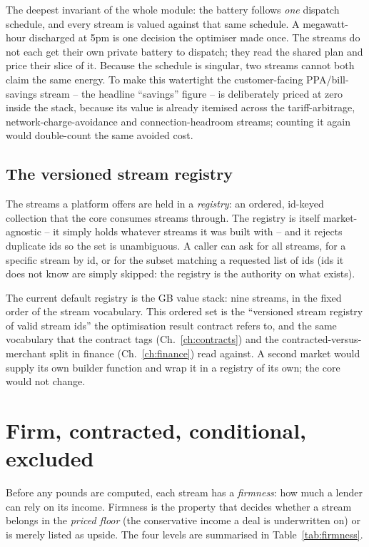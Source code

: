 \begin{keyidea}
The deepest invariant of the whole module: the battery follows \emph{one} dispatch schedule, and every stream is valued against that same schedule. A megawatt-hour discharged at 5pm is one decision the optimiser made once. The streams do not each get their own private battery to dispatch; they read the shared plan and price their slice of it. Because the schedule is singular, two streams cannot both claim the same energy. To make this watertight the customer-facing PPA/bill-savings stream -- the headline ``savings'' figure -- is deliberately priced at zero inside the stack, because its value is already itemised across the tariff-arbitrage, network-charge-avoidance and connection-headroom streams; counting it again would double-count the same avoided cost.
\end{keyidea}

\subsection{The versioned stream registry}

The streams a platform offers are held in a \emph{registry}: an ordered, id-keyed collection that the core consumes streams through. The registry is itself market-agnostic -- it simply holds whatever streams it was built with -- and it rejects duplicate ids so the set is unambiguous. A caller can ask for all streams, for a specific stream by id, or for the subset matching a requested list of ids (ids it does not know are simply skipped: the registry is the authority on what exists).

The current default registry is the GB value stack: nine streams, in the fixed order of the stream vocabulary. This ordered set is the ``versioned stream registry of valid stream ids'' the optimisation result contract refers to, and the same vocabulary that the contract tags (Ch.~\ref{ch:contracts}) and the contracted-versus-merchant split in finance (Ch.~\ref{ch:finance}) read against. A second market would supply its own builder function and wrap it in a registry of its own; the core would not change.

\section{Firm, contracted, conditional, excluded}
\label{sec:firmness}

Before any pounds are computed, each stream has a \emph{firmness}: how much a lender can rely on its income. Firmness is the property that decides whether a stream belongs in the \emph{priced floor} (the conservative income a deal is underwritten on) or is merely listed as upside. The four levels are summarised in Table~\ref{tab:firmness}.

